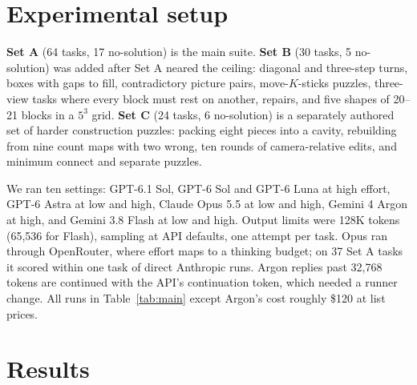 \documentclass[10pt,twocolumn,letterpaper]{article}
\begin{document}
\section{Experimental setup}
\textbf{Set A} (64 tasks, 17 no-solution) is the main suite. \textbf{Set B} (30 tasks, 5 no-solution) was added after Set A neared the ceiling: diagonal and three-step turns, boxes with gaps to fill, contradictory picture pairs, move-$K$-sticks puzzles, three-view tasks where every block must rest on another, repairs, and five shapes of 20--21 blocks in a $5^3$ grid. \textbf{Set C} (24 tasks, 6 no-solution) is a separately authored set of harder construction puzzles: packing eight pieces into a cavity, rebuilding from nine count maps with two wrong, ten rounds of camera-relative edits, and minimum connect and separate puzzles.

We ran ten settings: GPT-6.1 Sol, GPT-6 Sol and GPT-6 Luna at high effort, GPT-6 Astra at low and high, Claude Opus 5.5 at low and high, Gemini 4 Argon at high, and Gemini 3.8 Flash at low and high. Output limits were 128K tokens (65,536 for Flash), sampling at API defaults, one attempt per task. Opus ran through OpenRouter, where effort maps to a thinking budget; on 37 Set A tasks it scored within one task of direct Anthropic runs. Argon replies past 32,768 tokens are continued with the API's continuation token, which needed a runner change. All runs in Table~\ref{tab:main} except Argon's cost roughly \$120 at list prices.

\section{Results}
\end{document}
